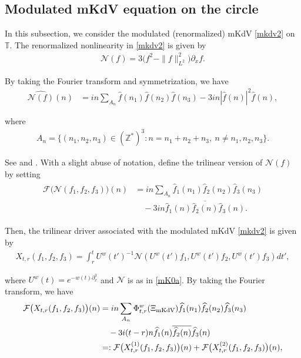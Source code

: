 \documentclass[letterpaper, 11pt,  reqno]{amsart}
\newcommand{\1}{\hspace{0.5mm}\text{I}\hspace{0.5mm}}
\newcommand{\noi}{\noindent}
\newcommand{\Z}{\mathbb{Z}}
\newcommand{\T}{\mathbb{T}}
\newcommand{\F}{\mathcal{F}}
\newcommand{\ft}{\widehat}
\newcommand{\cj}{\overline}
\newcommand{\dx}{\partial_x}
\newcommand{\NN}{\mathcal{N}}
\newcommand{\uw}{U^w}
\newcommand{\MKDV}{\text{\rm mKdV} }
\numberwithin{equation}{section}
\numberwithin{theorem}{section}
\begin{document}
\subsection{Modulated mKdV equation on the circle}
\label{SUBSEC:K2}

In this subsection,
we consider the modulated (renormalized) mKdV  \eqref{mkdv2} on $\T$.
The renormalized nonlinearity in \eqref{mkdv2} is given by 
\begin{align}
\NN(f)  = 3   \big(f^2- \|f\|_{L^2}^2\big)\dx f.
\label{mK0x}
\end{align}



\noi
By taking the Fourier transform and symmetrization, we have 
\begin{align}
\ft{\NN(f)}(n) 
& = in \sum_{A_n}
\ft f(n_1)\ft f(n_2)\ft f(n_3)
- 3 in |\ft f(n)|^2 \ft f(n), 
\label{mK0}
\end{align}


\noi
where 
\begin{align}
A_n =\big\{(n_1, n_2,n_3)\in (\Z^*)^3 : 
n = n_1+n_2+n_3, \ n\ne n_1, n_2, n_3\big\}.
\label{mK2b}
\end{align}



\noi
See
\cite[Lemma 8.16]{BO93}
and \cite[(1.9)]{TT}.
With a slight abuse of notation, 
define 
the trilinear version of $\NN(f)$ by 
setting
\begin{align}
\begin{split}
\F\big(\NN(f_1, f_2, f_3)\big)(n) 
& = in \sum_{A_n}
\ft f_1(n_1)\ft f_2(n_2)\ft f_3(n_3)\\
& \quad - 3 in \ft f_1(n)\cj{\ft f_2(n)}\ft f_3(n).
\end{split}
\label{mK0a}
\end{align}


\noi
Then, 
the trilinear driver associated with the modulated mKdV \eqref{mkdv2} is given by 
 \begin{align}
X_{t,r}(f_1,f_2, f_3)=\int_r^t  \uw(t')^{-1}
\NN( \uw(t')  f_1 , \uw(t') f_2,  \uw(t') f_3) dt',
\label{mK1}
\end{align}


\noi
\noi
where 
$\uw (t)=e^{- w(t)\dx^3 }  $
and $\NN$ is as in \eqref{mK0a}.
By taking the Fourier transform, we have 
\begin{align}
\begin{split}
\F\big(X_{t,r} (f_1,f_2, f_3) \big)(n)
& = in  \sum_{ A_n }
 \Phi^w_{t,r}(\Xi_\MKDV )
\ft f_1(n_1)  \ft f_2(n_2) \ft f_3(n_3)\\
& \quad - 3 i (t-r)n \ft f_1(n)\cj{\ft f_2(n)}\ft f_3(n)\\
& =:
\F\big(X_{t,r}^{(1)} (f_1,f_2, f_3) \big)(n)
+ \F\big(X_{t,r}^{(2)} (f_1,f_2, f_3) \big)(n), 
\end{split}
\label{mK2}
\end{align}
\end{document}
